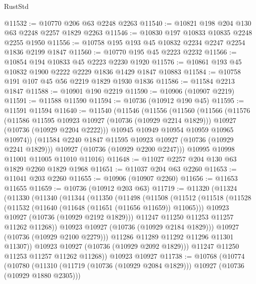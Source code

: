 \begin{lexlean}{RustStd}
\begin{coremodule}
@11532 := @10770 @206 @63 @2248 @2263
@11540 := @10821 @198 @204 @130 @63 @2248 @2257 @1829 @2263
@11546 := @10830 @197 @10833 @10835 @2248 @2255 @1950
@11556 := @10758 @195 @193 @45 @10832 @2234 @2247 @2254 @1836 @2199 @1847
@11560 := @10770 @195 @45 @2223 @2232
@11566 := @10854 @194 @10833 @45 @2223 @2230 @1920
@11576 := @10861 @193 @45 @10832 @1900 @2222 @2229 @1836 @1429 @1847 @10883
@11584 := @10758 @191 @107 @45 @56 @2219 @1829 @1930 @1836
@11586 := @11584 @2213 @1847
@11588 := @10901 @190 @2219
@11590 := @10906 (@10907 @2219)
@11591 := @11588 @11590
@11594 := @10736 (@10912 @190 @45)
@11595 := @11591 @11594
@11640 := @11540
    (@11546
      (@11556
        (@11560
          (@11566
            (@11576
              (@11586 @11595 @10923 @10927 (@10736 (@10929 @2214 @1829)))
              @10927
              (@10736 (@10929 @2204 @2222)))
            @10945
            @10949
            @10954
            @10959
            @10965
            @10974))
        (@11584 @2240 @1847 @11595 @10923 @10927 (@10736 (@10929 @2241 @1829)))
        @10927
        (@10736 (@10929 @2200 @2247)))
      @10995
      @10998
      @11001
      @11005
      @11010
      @11016)
@11648 := @11027 @2257 @204 @130 @63 @1829 @2260 @1829 @1968
@11651 := @11037 @204 @63 @2260
@11653 := @11041 @203 @2260
@11655 := @10906 (@10907 @2260)
@11656 := @11653 @11655
@11659 := @10736 (@10912 @203 @63)
@11719 := @11320
    (@11324
      (@11330
        (@11340
          (@11344
            (@11350
              (@11498
                (@11508
                  (@11512
                    (@11518
                      (@11528
                        (@11532 (@11640 (@11648 (@11651 (@11656 @11659)) @11065)))
                        @10923
                        @10927
                        (@10736 (@10929 @2192 @1829)))
                      @11247
                      @11250
                      @11253
                      @11257
                      @11262
                      @11268))
                  @10923
                  @10927
                  (@10736 (@10929 @2184 @1829)))
                @10927
                (@10736 (@10929 @2100 @2279)))
              @11286
              @11289
              @11292
              @11296
              @11301
              @11307))
          @10923
          @10927
          (@10736 (@10929 @2092 @1829)))
        @11247
        @11250
        @11253
        @11257
        @11262
        @11268))
    @10923
    @10927
@11738 := @10768
    (@10774
      (@10780
        (@11310 (@11719 (@10736 (@10929 @2084 @1829))) @10927 (@10736 (@10929 @1880 @2305)))

\end{coremodule}
\end{lexlean}
